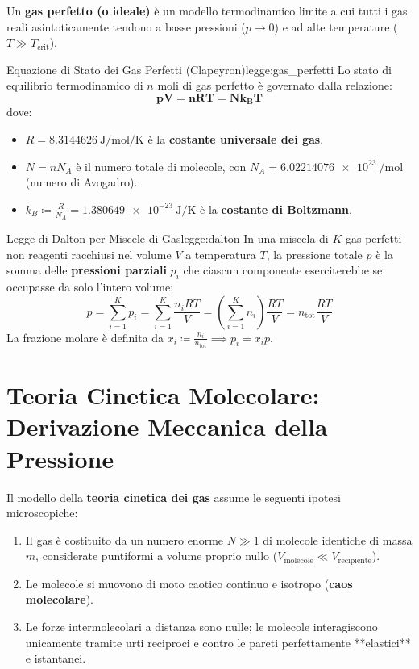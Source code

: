 Un \textbf{gas perfetto (o ideale)} è un modello termodinamico limite a cui tutti i gas reali asintoticamente tendono a basse pressioni ($p \to 0$) e ad alte temperature ($T \gg T_{\text{crit}}$).

\begin{legge}{Equazione di Stato dei Gas Perfetti (Clapeyron)}{legge:gas_perfetti}
Lo stato di equilibrio termodinamico di $n$ moli di gas perfetto è governato dalla relazione:
\begin{equation}
    \mathbf{p V = n R T = N k_B T}
    \label{eq:gas_perfetti}
\end{equation}
dove:
\begin{itemize}
    \item $R = \SI{8.3144626}{\joule\per\mole\per\kelvin}$ è la \textbf{costante universale dei gas}.
    \item $N = n N_A$ è il numero totale di molecole, con $N_A = \SI{6.02214076e23}{\per\mole}$ (numero di Avogadro).
    \item $k_B \coloneqq \frac{R}{N_A} = \SI{1.380649e-23}{\joule\per\kelvin}$ è la \textbf{costante di Boltzmann}.
\end{itemize}
\end{legge}

\begin{legge}{Legge di Dalton per Miscele di Gas}{legge:dalton}
In una miscela di $K$ gas perfetti non reagenti racchiusi nel volume $V$ a temperatura $T$, la pressione totale $p$ è la somma delle \textbf{pressioni parziali} $p_i$ che ciascun componente eserciterebbe se occupasse da solo l'intero volume:
\begin{equation}
    p = \sum_{i=1}^K p_i = \sum_{i=1}^K \frac{n_i R T}{V} = \left(\sum_{i=1}^K n_i\right)\frac{RT}{V} = n_{\text{tot}}\frac{RT}{V}
    \label{eq:dalton}
\end{equation}
La frazione molare è definita da $x_i \coloneqq \frac{n_i}{n_{\text{tot}}} \implies p_i = x_i p$.
\end{legge}

\section{Teoria Cinetica Molecolare: Derivazione Meccanica della Pressione}
\label{sec:teoria_cinetica}

Il modello della \textbf{teoria cinetica dei gas} assume le seguenti ipotesi microscopiche:
\begin{enumerate}
    \item Il gas è costituito da un numero enorme $N \gg 1$ di molecole identiche di massa $m$, considerate puntiformi a volume proprio nullo ($V_{\text{molecole}} \ll V_{\text{recipiente}}$).
    \item Le molecole si muovono di moto caotico continuo e isotropo (\textbf{caos molecolare}).
    \item Le forze intermolecolari a distanza sono nulle; le molecole interagiscono unicamente tramite urti reciproci e contro le pareti perfettamente **elastici** e istantanei.
\end{enumerate}

